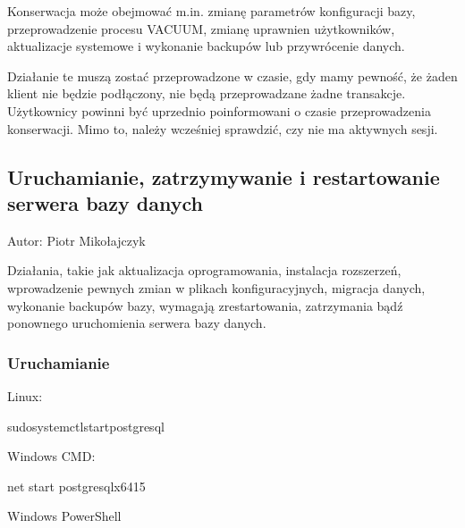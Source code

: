 \documentclass[a4paper,11pt,openany,english]{sphinxmanual}
\begin{document}
\sphinxAtStartPar
Konserwacja może obejmować m.in. zmianę parametrów konfiguracji bazy, przeprowadzenie procesu VACUUM, zmianę uprawnien użytkowników, aktualizacje systemowe i wykonanie backupów lub przywrócenie danych.

\sphinxAtStartPar
Działanie te muszą zostać przeprowadzone w czasie, gdy mamy pewność, że żaden klient nie będzie podłączony, nie będą przeprowadzane żadne transakcje. Użytkownicy powinni być uprzednio poinformowani o czasie przeprowadzenia konserwacji. Mimo to, należy wcześniej sprawdzić, czy nie ma aktywnych sesji.


\subsection{Uruchamianie, zatrzymywanie i restartowanie serwera bazy danych}
\label{\detokenize{rozdzial2/Kontrola_i_konserwacja/kontrola_i_konserwacja:uruchamianie-zatrzymywanie-i-restartowanie-serwera-bazy-danych}}
\sphinxAtStartPar
Autor: Piotr Mikołajczyk

\sphinxAtStartPar
Działania, takie jak aktualizacja oprogramowania, instalacja rozszerzeń, wprowadzenie pewnych zmian w plikach konfiguracyjnych, migracja danych, wykonanie backupów bazy, wymagają zrestartowania, zatrzymania bądź ponownego uruchomienia serwera bazy danych.


\subsubsection{Uruchamianie}
\label{\detokenize{rozdzial2/Kontrola_i_konserwacja/kontrola_i_konserwacja:uruchamianie}}
\sphinxAtStartPar
Linux:

\begin{sphinxVerbatim}[commandchars=\\\{\}]
sudosystemctlstartpostgresql
\end{sphinxVerbatim}

\sphinxAtStartPar
Windows CMD:

\begin{sphinxVerbatim}[commandchars=\\\{\}]
net start postgresql\PYGZhy{}x64\PYGZhy{}15
\end{sphinxVerbatim}

\sphinxAtStartPar
Windows PowerShell

\begin{sphinxVerbatim}[commandchars=\\\{\}]
  
\end{sphinxVerbatim}
\end{document}
